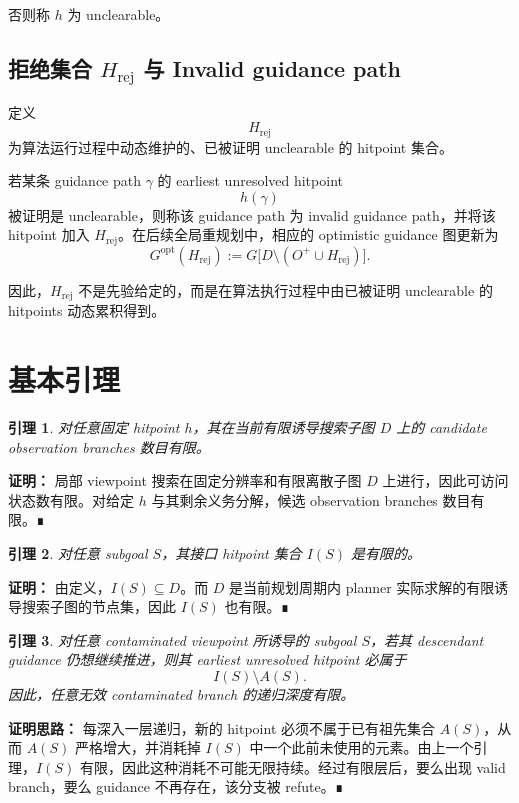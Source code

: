 \documentclass[11pt]{ctexart}
\newtheorem{lemma}{引理}
\begin{document}
否则称 $h$ 为 unclearable。

\subsection{拒绝集合 $H_{\mathrm{rej}}$ 与 Invalid guidance path}

定义
\[
H_{\mathrm{rej}}
\]
为算法运行过程中动态维护的、已被证明 unclearable 的 hitpoint 集合。

若某条 guidance path $\gamma$ 的 earliest unresolved hitpoint
\[
h(\gamma)
\]
被证明是 unclearable，则称该 guidance path 为 invalid guidance path，并将该 hitpoint 加入 $H_{\mathrm{rej}}$。在后续全局重规划中，相应的 optimistic guidance 图更新为
\[
G^{\mathrm{opt}}(H_{\mathrm{rej}})
:= G\big[D\setminus (O^{+}\cup H_{\mathrm{rej}})\big].
\]

因此，$H_{\mathrm{rej}}$ 不是先验给定的，而是在算法执行过程中由已被证明 unclearable 的 hitpoints 动态累积得到。

\section{基本引理}

\begin{lemma}
对任意固定 hitpoint $h$，其在当前有限诱导搜索子图 $D$ 上的 candidate observation branches 数目有限。
\end{lemma}

\noindent\textbf{证明：}
局部 viewpoint 搜索在固定分辨率和有限离散子图 $D$ 上进行，因此可访问状态数有限。对给定 $h$ 与其剩余义务分解，候选 observation branches 数目有限。∎

\begin{lemma}
对任意 subgoal $S$，其接口 hitpoint 集合 $I(S)$ 是有限的。
\end{lemma}

\noindent\textbf{证明：}
由定义，$I(S)\subseteq D$。而 $D$ 是当前规划周期内 planner 实际求解的有限诱导搜索子图的节点集，因此 $I(S)$ 也有限。∎

\begin{lemma}
对任意 contaminated viewpoint 所诱导的 subgoal $S$，若其 descendant guidance 仍想继续推进，则其 earliest unresolved hitpoint 必属于
\[
I(S)\setminus A(S).
\]
因此，任意无效 contaminated branch 的递归深度有限。
\end{lemma}

\noindent\textbf{证明思路：}
每深入一层递归，新的 hitpoint 必须不属于已有祖先集合 $A(S)$，从而 $A(S)$ 严格增大，并消耗掉 $I(S)$ 中一个此前未使用的元素。由上一个引理，$I(S)$ 有限，因此这种消耗不可能无限持续。经过有限层后，要么出现 valid branch，要么 guidance 不再存在，该分支被 refute。∎
\end{document}
